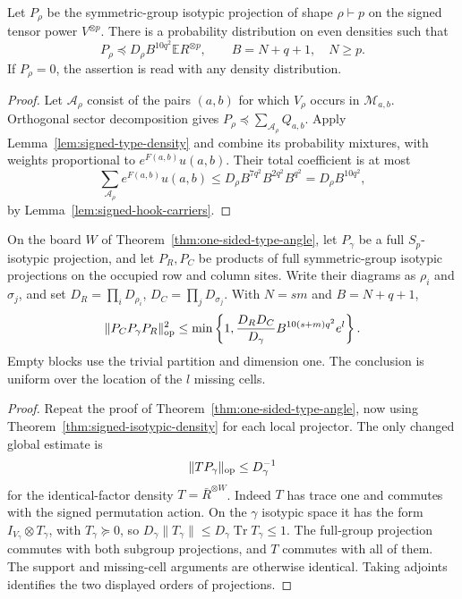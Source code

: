 \begin{theorem}
\label{thm:signed-isotypic-density}
Let $P_\rho$ be the symmetric-group isotypic projection of shape
$\rho\vdash p$ on the signed tensor power $V^{\otimes p}$.
There is a probability distribution on even densities such that
\begin{equation}
 P_\rho\preceq D_\rho B^{10q^2}\mathbb E R^{\otimes p},
 \qquad B=N+q+1,\quad N\ge p.
 \label{eq:signed-isotypic-density}
\end{equation}
If $P_\rho=0$, the assertion is read with any density distribution.
\end{theorem}
\begin{proof}
Let $\mathcal A_\rho$ consist of the pairs $(a,b)$ for which
$V_\rho$ occurs in $\mathcal M_{a,b}$. Orthogonal sector
decomposition gives $P_\rho\preceq\sum_{\mathcal A_\rho}Q_{a,b}$.
Apply Lemma~\ref{lem:signed-type-density} and combine its probability
mixtures, with weights proportional to $e^{F(a,b)}u(a,b)$.
Their total coefficient is at most
\[
 \sum_{\mathcal A_\rho}e^{F(a,b)}u(a,b)
 \le D_\rho B^{7q^2}B^{2q^2}B^{q^2}
 =D_\rho B^{10q^2},
\]
by Lemma~\ref{lem:signed-hook-carriers}.
\end{proof}

\begin{corollary}
\label{cor:signed-isotypic-angle}
On the board $W$ of Theorem~\ref{thm:one-sided-type-angle}, let
$P_\gamma$ be a full $S_p$-isotypic projection, and let $P_R,P_C$
be products of full symmetric-group isotypic projections on the
occupied row and column sites. Write their diagrams as $\rho_i$ and
$\sigma_j$, and set $D_R=\prod_iD_{\rho_i}$,
$D_C=\prod_jD_{\sigma_j}$. With $N=sm$ and $B=N+q+1$,
\begin{equation}
 \|P_C P_\gamma P_R\|_{\rm op}^2
 \le\min\left\{1,
  \frac{D_RD_C}{D_\gamma}B^{10(s+m)q^2}e^l\right\}.
 \label{eq:signed-isotypic-angle}
\end{equation}
Empty blocks use the trivial partition and dimension one. The
conclusion is uniform over the location of the $l$ missing cells.
\end{corollary}
\begin{proof}
Repeat the proof of Theorem~\ref{thm:one-sided-type-angle}, now using
Theorem~\ref{thm:signed-isotypic-density} for each local projector.
The only changed global estimate is
\[
 \|T P_\gamma\|_{\rm op}\le D_\gamma^{-1}
\]
for the identical-factor density $T=\bar R^{\otimes W}$.
Indeed $T$ has trace one and commutes with the signed permutation
action. On the $\gamma$ isotypic space it has the form
$I_{V_\gamma}\otimes T_\gamma$, with $T_\gamma\succeq0$, so
$D_\gamma\|T_\gamma\|\le
D_\gamma\operatorname{Tr}T_\gamma\le1$.
The full-group projection commutes with both subgroup projections,
and $T$ commutes with all of them. The support and missing-cell
arguments are otherwise identical. Taking adjoints identifies the
two displayed orders of projections.
\end{proof}


